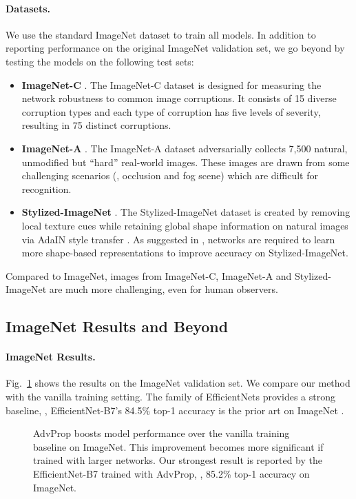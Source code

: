 \documentclass[10pt,twocolumn,letterpaper]{article}
\begin{document}
\paragraph{Datasets.} We use the standard ImageNet dataset \cite{Russakovsky2015} to train all models. In addition to reporting performance on the original ImageNet validation set, we go beyond by testing the models on the following  test sets:
\begin{itemize}[leftmargin=*]
    \setlength\itemsep{0.1em}
    \item \textbf{ImageNet-C} \cite{Hendrycks2018}. The ImageNet-C dataset is designed for measuring the network robustness to common image corruptions. It consists of 15 diverse corruption types and each type of corruption has five levels of severity, resulting in 75 distinct corruptions. 
    \item \textbf{ImageNet-A} \cite{Hendrycks2019b}. The ImageNet-A dataset adversarially collects 7,500 natural, unmodified but ``hard'' real-world images. These images are drawn from some challenging scenarios (\eg, occlusion and fog scene)  which are difficult for recognition.
    \item \textbf{Stylized-ImageNet} \cite{Geirhos2018}. The Stylized-ImageNet dataset is created by removing local texture cues while retaining global shape information on natural images via AdaIN style transfer \cite{Huang2017a}. As suggested in \cite{Geirhos2018}, networks are required to learn more shape-based representations to improve accuracy on Stylized-ImageNet. 
\end{itemize}


Compared to ImageNet, images from ImageNet-C, ImageNet-A and Stylized-ImageNet are much more challenging, even for human observers.


\subsection{ImageNet Results and Beyond}
\paragraph{ImageNet Results.} 
Fig.~\ref{fig:overview} shows the results on the ImageNet validation set. We compare our method with the vanilla training setting. The family of EfficientNets provides a strong baseline, \eg, EfficientNet-B7's 84.5\% top-1 accuracy is the prior art on ImageNet \cite{Tan2019}.


\begin{figure}[t!]
\centering
{}
\vspace{-1.4em}
\caption{AdvProp boosts model performance over the vanilla training baseline on ImageNet. 
This improvement becomes more significant if trained with larger networks. Our strongest result is reported by the EfficientNet-B7 trained with AdvProp, \ie, 85.2\% top-1 accuracy on ImageNet.}
\label{fig:overview} 
\vspace{-1.5em}
\end{figure}
\end{document}
